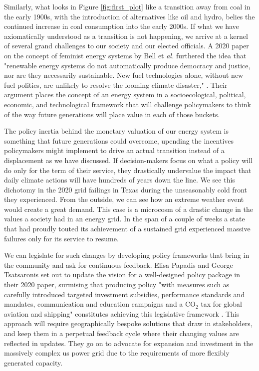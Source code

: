 Similarly, what looks in Figure \ref{fig:first_plot} like a transition away from coal in the early 1900s, with the introduction of alternatives like oil and hydro, belies the continued increase in coal consumption into the early 2000s. If what we have axiomatically understood as a transition is not happening, we arrive at a kernel of several grand challenges to our society and our elected officials. A 2020 paper on the concept of feminist energy systems by Bell et \textit{al.} furthered the idea that "renewable energy systems do not automatically produce democracy and justice, nor are they necessarily sustainable. New fuel technologies alone, without new fuel politics, are unlikely to resolve the looming climate disaster," \cite{bell_toward_2020}. Their argument places the concept of an energy system in a socioecological, political, economic, and technological framework that will challenge policymakers to think of the way future generations will place value in each of those buckets.

The policy inertia behind the monetary valuation of our energy system is something that future generations could overcome, upending the incentives policymakers might implement to drive an actual transition instead of a displacement as we have discussed. If decision-makers focus on what a policy will do only for the term of their service, they drastically undervalue the impact that daily climate actions will have hundreds of years down the line. We see this dichotomy in the 2020 grid failings in Texas during the unseasonably cold front they experienced. From the outside, we can see how an extreme weather event would create a great demand. This case is a microcosm of a drastic change in the values a society had in an energy grid. In the span of a couple of weeks a state that had proudly touted its achievement of a sustained grid \cite{texas_ercot_nodate} experienced massive failures only for its service to resume.

We can legislate for such changes by developing policy frameworks that bring in the community and ask for continuous feedback. Elisa Papadis and George Tsatsaronis set out to update the vision for a well-designed policy package in their 2020 paper, surmising that producing policy "with measures such as carefully introduced targeted investment subsidies, performance standards and mandates, communication and education campaigns and a CO$_2$ tax for global aviation and shipping" constitutes achieving this legislative framework \cite{papadis_challenges_2020}. This approach will require geographically bespoke solutions that draw in stakeholders, and keep them in a perpetual feedback cycle where their changing values are reflected in updates. They go on to advocate for expansion and investment in the massively complex \gls{us} power grid due to the requirements of more flexibly generated capacity.

